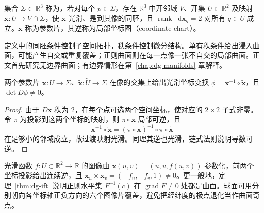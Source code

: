 \documentclass[UTF8,12pt,a4paper,fontset=fandol]{ctexbook}
\newcommand{\R}{\mathbb R}
\newcommand{\dd}{\mathop{}\!\mathrm d}
\DeclareMathOperator{\rank}{rank}
\DeclareMathOperator{\grad}{grad}
\begin{document}
\begin{definition}[正则曲面与参数片]
集合 $\Sigma\subset\R^3$ 称为，若对每个 $p\in\Sigma$，存在 $\R^3$ 中开邻域 $V$、开集 $U\subset\R^2$ 及映射 $\mathbf x:U\to V\cap\Sigma$，使 $\mathbf x$ 光滑、是到其像的同胚，且 $\rank\dd\mathbf x_q=2$ 对所有 $q\in U$ 成立。$\mathbf x$ 称为参数片，其逆称为局部坐标图（coordinate chart）。
\label{def:dg-surface}
\end{definition}
定义中的同胚条件控制子空间拓扑，秩条件控制微分结构。单有秩条件给出浸入曲面，可能产生自交或重复覆盖；正则曲面则在每一点像一张不自交的局部曲面。正文首先研究无边界曲面；有边界情形在第~\ref{chap:dg-manifolds} 章解释。

\begin{proposition}[坐标过渡的光滑性]
两个参数片 $\mathbf x:U\to\Sigma$、$\widetilde{\mathbf x}:\widetilde U\to\Sigma$ 在像的交集上给出光滑坐标变换 $\phi=\mathbf x^{-1}\circ\widetilde{\mathbf x}$，且 $\det D\phi\ne0$。
\end{proposition}
\begin{proof}
由于 $D\mathbf x$ 秩为 $2$，在每个点可选两个空间坐标，使对应的 $2\times2$ 子式非零。令 $\pi$ 为投影到这两个坐标的映射，则 $\pi\circ\mathbf x$ 局部可逆，且
\[
 \mathbf x^{-1}\circ\widetilde{\mathbf x}
 =(\pi\circ\mathbf x)^{-1}\circ\pi\circ\widetilde{\mathbf x}
\]
在足够小的邻域成立，故过渡映射光滑。同理其逆也光滑，链式法则说明导数可逆。
\end{proof}

\begin{example}[图像、水平集与球面]
光滑函数 $f:U\subset\R^2\to\R$ 的图像由 $\mathbf x(u,v)=(u,v,f(u,v))$ 参数化，前两个坐标投影给出连续逆，且 $\mathbf x_u\times\mathbf x_v=(-f_u,-f_v,1)\ne0$。更一般地，定理~\ref{thm:dg-ift} 说明正则水平集 $F^{-1}(c)$ 在 $\grad F\ne0$ 处都是曲面。球面可用分别朝向各坐标轴正负方向的六个图像片覆盖，避免把经纬度的极点退化当作曲面奇点。
\end{example}
\end{document}
